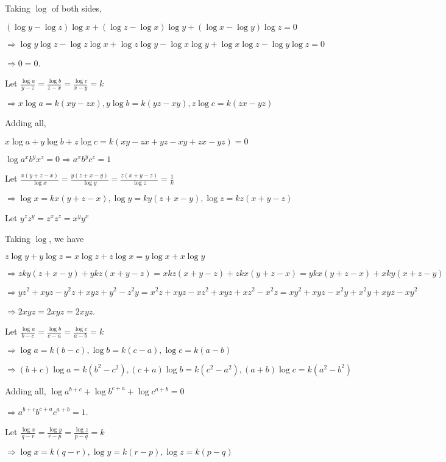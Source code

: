   Taking $\log$ of both sides,

  $(\log y - \log z)\log x + (\log z - \log x)\log y + (\log x - \log y)\log z = 0$

  $\Rightarrow \log y\log z - \log z\log x + \log z\log y - \log x\log y + \log x\log z - \log y\log z = 0$

  $\Rightarrow 0 = 0$.
\item Let $\frac{\log a}{y - z} = \frac{\log b}{z - x} = \frac{\log c}{x - y} = k$

  $\Rightarrow x\log a = k(xy - zx), y\log b = k(yz - xy), z\log c = k(zx - yz)$

  Adding all,

  $x\log a + y\log b + z\log c = k(xy - zx + yz - xy + zx - yz) = 0$

  $\log a^xb^yx^z = 0\Rightarrow a^xb^yc^z = 1$
\item Let $\frac{x(y + z - x)}{\log x} = \frac{y(z + x - y)}{\log y} = \frac{z(x + y - z)}{\log z} = \frac{1}{k}$

  $\Rightarrow \log x = kx(y + z - x), \log y = ky(z + x - y), \log z = kz(x + y - z)$

  Let $y^zz^y = z^xz^z = x^yy^x$

  Taking $\log$, we have

  $z\log y + y\log z = x\log z + z\log x = y\log x + x\log y$

  $\Rightarrow zky(z + x - y) + ykz(x + y - z) = xkz(x + y - z) + zkx(y + z - x) = ykx(y + z - x) + xky(x + z - y)$

  $\Rightarrow yz^2 + xyz - y^2z + xyz + y^2 - z^2y = x^2z + xyz - xz^2 + xyz + xz^2 - x^2z = xy^2 + xyz - x^2y + x^2y + xyz -
  xy^2$

  $\Rightarrow 2xyz = 2xyz = 2xyz$.
\item Let $\frac{\log a}{b - c} = \frac{\log b}{c - a} = \frac{\log c}{a - b} = k$

  $\Rightarrow \log a = k(b - c), \log b = k(c - a), \log c = k(a - b)$

  $\Rightarrow (b + c)\log a = k(b^2 - c^2), (c + a)\log b = k(c^2 - a^2), (a + b)\log c = k(a^2 - b^2)$

  Adding all, $\log a^{b + c} + \log b^{c + a} + \log c^{a + b} = 0$

  $\Rightarrow a^{b + c}b^{c + a}c^{a + b} = 1$.
\item Let $\frac{\log x}{q - r} = \frac{\log y}{r - p} = \frac{\log z}{p - q} = k$

  $\Rightarrow \log x = k(q - r), \log y = k(r - p), \log z = k(p - q)$

